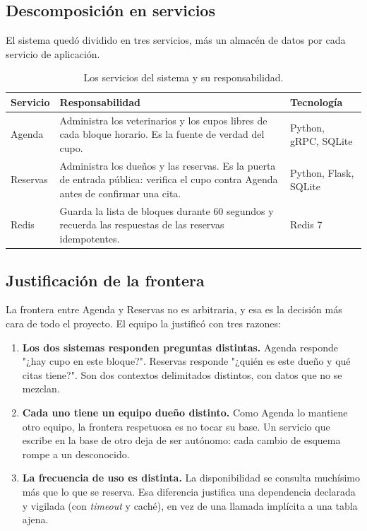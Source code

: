 \documentclass[12pt, a4paper]{article}
\begin{document}
\subsection{Descomposición en servicios}

El sistema quedó dividido en tres servicios, más un almacén de datos por
cada servicio de aplicación.

\begin{table}[H]
\centering
\caption{Los servicios del sistema y su responsabilidad.}
\begin{tabular}{@{}p{2.6cm}p{5.6cm}p{4.3cm}@{}}
\toprule
\textbf{Servicio} & \textbf{Responsabilidad} & \textbf{Tecnología} \\
\midrule
Agenda &
Administra los veterinarios y los cupos libres de cada bloque horario.
Es la fuente de verdad del cupo. &
Python, gRPC, SQLite \\
\addlinespace
Reservas &
Administra los dueños y las reservas. Es la puerta de entrada pública:
verifica el cupo contra Agenda antes de confirmar una cita. &
Python, Flask, SQLite \\
\addlinespace
Redis &
Guarda la lista de bloques durante 60 segundos y recuerda las respuestas
de las reservas idempotentes. &
Redis 7 \\
\bottomrule
\end{tabular}
\end{table}

\subsection{Justificación de la frontera}

La frontera entre Agenda y Reservas no es arbitraria, y esa es la decisión
más cara de todo el proyecto. El equipo la justificó con tres razones:

\begin{enumerate}[leftmargin=1.7cm]
    \item \textbf{Los dos sistemas responden preguntas distintas.} Agenda
    responde "¿hay cupo en este bloque?". Reservas responde "¿quién es
    este dueño y qué citas tiene?". Son dos contextos delimitados
    distintos, con datos que no se mezclan.
    \item \textbf{Cada uno tiene un equipo dueño distinto.} Como Agenda lo
    mantiene otro equipo, la frontera respetuosa es no tocar su base. Un
    servicio que escribe en la base de otro deja de ser autónomo: cada
    cambio de esquema rompe a un desconocido.
    \item \textbf{La frecuencia de uso es distinta.} La disponibilidad se
    consulta muchísimo más que lo que se reserva. Esa diferencia justifica
    una dependencia declarada y vigilada (con \emph{timeout} y caché), en
    vez de una llamada implícita a una tabla ajena.
\end{enumerate}
\end{document}
